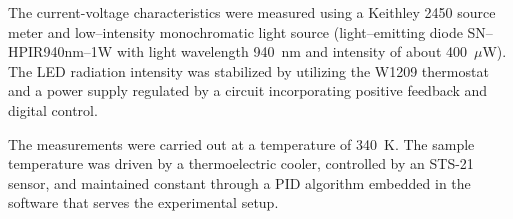 \documentclass{WileyMSP-template}
\begin{document}
The current-voltage characteristics were measured using a Keithley 2450 source meter and
low--intensity monochromatic light source (light--emitting diode SN--HPIR940nm--1W with light wavelength 940~nm and intensity of about 400~$\mu$W).
The LED radiation intensity was stabilized by utilizing the W1209 thermostat and a power supply regulated by a circuit incorporating positive feedback and digital control.

The measurements were carried out at a temperature of 340~K.
The sample temperature was driven by a thermoelectric cooler,
controlled by an STS-21 sensor,
and maintained constant through a PID algorithm embedded in the software that serves the experimental setup.



%
\end{document}
